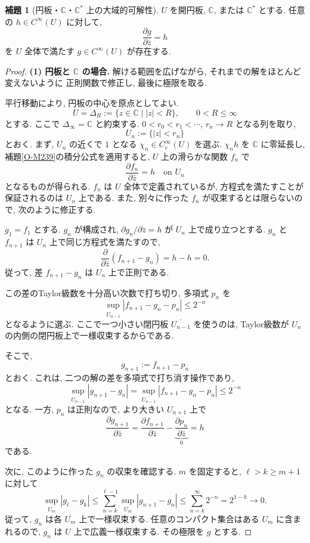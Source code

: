 \documentclass[dvipdfmx,a4paper,11pt]{article} %
\newcommand{\C}{\mathbb{C}}
\theoremstyle{definition}
\numberwithin{equation}{section}
\newtheorem{lem}[thm]{補題}
\begin{document}
\begin{lem}[円板・$\C$・$\C^*$ 上の大域的可解性]\label{O-M241}
$U$ を開円板, $\C$, または $\C^*$ とする.
任意の $h\in C^\infty(U)$ に対して, 
\[
\frac{\partial g}{\partial\overline z}=h
\]
を $U$ 全体で満たす $g\in C^\infty(U)$ が存在する.
\end{lem}

\begin{proof}

\textbf{(1) 円板と $\C$ の場合.}
解ける範囲を広げながら, それまでの解をほとんど変えないように
正則関数で修正し, 最後に極限を取る.

平行移動により, 円板の中心を原点としてよい.
\[
U=\Delta_R:=\{z\in\C\mid |z|<R\},
\qquad 0<R\leq\infty
\]
とする. ここで $\Delta_\infty=\C$ と約束する.
$0<r_0<r_1<\cdots$, $r_n\to R$ となる列を取り,
\[
U_n:=\{|z|<r_n\}
\]
とおく.
まず, $\overline{U_n}$ の近くで $1$ となる
$\chi_n\in C_c^\infty(U)$ を選ぶ.
$\chi_nh$ を $\C$ に零延長し,
補題\ref{O-M239}の積分公式を適用すると,
$U$ 上の滑らかな関数 $f_n$ で
\[
\frac{\partial f_n}{\partial\bar z}=h
\quad\text{on }U_n
\]
となるものが得られる.
$f_n$ は $U$ 全体で定義されているが,
方程式を満たすことが保証されるのは $U_n$ 上である.
また, 別々に作った $f_n$ が収束するとは限らないので,
次のように修正する.

$g_1=f_1$ とする.
$g_n$ が構成され,
$\partial g_n/\partial\bar z=h$ が $U_n$ 上で成り立つとする.
$g_n$ と $f_{n+1}$ は $U_n$ 上で同じ方程式を満たすので,
\[
\frac{\partial}{\partial\bar z}(f_{n+1}-g_n)=h-h=0.
\]
従って, 差 $f_{n+1}-g_n$ は $U_n$ 上で正則である.

この差のTaylor級数を十分高い次数で打ち切り,
多項式 $p_n$ を
\[
\sup_{\overline{U_{n-1}}}
|f_{n+1}-g_n-p_n|\leq2^{-n}
\]
となるように選ぶ.
ここで一つ小さい閉円板 $\overline{U_{n-1}}$ を使うのは,
Taylor級数が $U_n$ の内側の閉円板上で一様収束するからである.

そこで,
\[
g_{n+1}:=f_{n+1}-p_n
\]
とおく.
これは, 二つの解の差を多項式で打ち消す操作であり,
\[
\sup_{\overline{U_{n-1}}}|g_{n+1}-g_n|
=
\sup_{\overline{U_{n-1}}}|f_{n+1}-g_n-p_n|
\leq2^{-n}
\]
となる.
一方, $p_n$ は正則なので,
より大きい $U_{n+1}$ 上で
\[
\frac{\partial g_{n+1}}{\partial\bar z}
=
\frac{\partial f_{n+1}}{\partial\bar z}
-\underbrace{\frac{\partial p_n}{\partial\bar z}}_{0}
=h
\]
である.

次に, このように作った $g_n$ の収束を確認する.
$m$ を固定すると, $\ell>k\geq m+1$ に対して
\[
\sup_{\overline{U_m}}|g_\ell-g_k|
\leq
\sum_{n=k}^{\ell-1}
\sup_{\overline{U_m}}|g_{n+1}-g_n|
\leq
\sum_{n=k}^{\infty}2^{-n}
=2^{1-k}\longrightarrow0.
\]
従って, $g_n$ は各 $\overline{U_m}$ 上で一様収束する.
任意のコンパクト集合はある $U_m$ に含まれるので,
$g_n$ は $U$ 上で広義一様収束する.
その極限を $g$ とする.


\end{proof}
\end{document}
